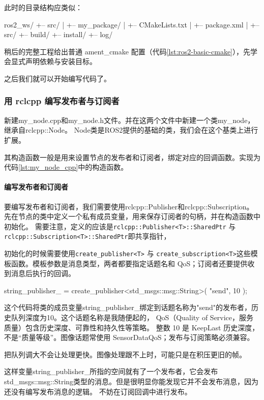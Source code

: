 此时的目录结构应类似：
\par\medskip\noindent\begin{minipage}{\linewidth}
\begin{tbash}
ros2_ws/
+-- src/
|   +-- my_package/
|       +-- CMakeLists.txt
|       +-- package.xml
|       +-- src/
+-- build/
+-- install/
+-- log/
\end{tbash}
\end{minipage}\par\smallskip

稍后的完整工程给出普通 ament\_cmake 配置（代码\ref{lst:ros2-basic-cmake}），先学会显式声明依赖与安装目标。

之后我们就可以开始编写代码了。
\subsubsection{用 rclcpp 编写发布者与订阅者}

新建my\_node.cpp和my\_node.h文件。并在这两个文件中新建一个类my\_node，继承自rclcpp::Node。
Node类是ROS2提供的基础的类，我们会在这个基类上进行扩展。

其构造函数一般是用来设置节点的发布者和订阅者，绑定对应的回调函数。实现为代码\ref{lst:my_node_cpp}中的构造函数。
\paragraph*{编写发布者和订阅者}
要编写发布者和订阅者，我们需要使用rclcpp::Publisher和rclcpp::Subscription。
先在节点的类中定义一个私有成员变量，用来保存订阅者的句柄，并在构造函数中初始化。
需要注意，定义的应该是\texttt{rclcpp::Publisher<T>::SharedPtr} 与 \texttt{rclcpp::Subscription<T>::SharedPtr}即共享指针，

初始化的时候需要使用\texttt{create\_publisher<T>} 与 \texttt{create\_subscription<T>}这些模板函数。模板参数是消息类型，两者都要指定话题名和 QoS；订阅者还要提供收到消息后执行的回调。


\par\medskip\noindent\begin{minipage}{\linewidth}
\begin{tcode}
    string_publisher_ = create_publisher<std_msgs::msg::String>(
         "send",
         10
         );
\end{tcode}
\end{minipage}\par\smallskip
这个代码将类的成员变量string\_publisher\_绑定到话题名称为"send"的发布者，历史队列深度为10。这个话题名称是我随便起的，
QoS（Quality of Service，服务质量）包含历史深度、可靠性和持久性等策略。
整数 10 是 KeepLast 历史深度，不是“质量等级”。图像话题常使用 SensorDataQoS；发布与订阅策略必须兼容。
\begin{note}
把队列调大不会让处理更快。图像处理跟不上时，可能只是在积压更旧的帧。
\end{note}
这样变量string\_publisher\_所指的空间就有了一个发布者，它会发布std\_msgs::msg::String类型的消息。但是很明显你能发现它并不会发布消息，因为还没有编写发布消息的逻辑。
不妨在订阅回调中进行发布。

